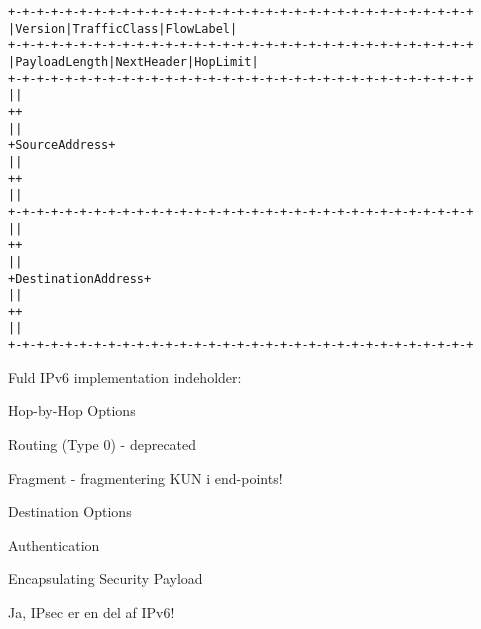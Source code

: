 \documentclass[Screen16to9,17pt]{foils}
\begin{document}
\begin{alltt}\footnotesize
   +-+-+-+-+-+-+-+-+-+-+-+-+-+-+-+-+-+-+-+-+-+-+-+-+-+-+-+-+-+-+-+-+
   |Version| Traffic Class |           Flow Label                  |
   +-+-+-+-+-+-+-+-+-+-+-+-+-+-+-+-+-+-+-+-+-+-+-+-+-+-+-+-+-+-+-+-+
   |         Payload Length        |  Next Header  |   Hop Limit   |
   +-+-+-+-+-+-+-+-+-+-+-+-+-+-+-+-+-+-+-+-+-+-+-+-+-+-+-+-+-+-+-+-+
   |                                                               |
   +                                                               +
   |                                                               |
   +                         Source Address                        +
   |                                                               |
   +                                                               +
   |                                                               |
   +-+-+-+-+-+-+-+-+-+-+-+-+-+-+-+-+-+-+-+-+-+-+-+-+-+-+-+-+-+-+-+-+
   |                                                               |
   +                                                               +
   |                                                               |
   +                      Destination Address                      +
   |                                                               |
   +                                                               +
   |                                                               |
   +-+-+-+-+-+-+-+-+-+-+-+-+-+-+-+-+-+-+-+-+-+-+-+-+-+-+-+-+-+-+-+-+
\end{alltt}



\begin{list1}
\item Fuld IPv6 implementation indeholder:
\begin{list2}
\item Hop-by-Hop Options
\item Routing (Type 0) - deprecated
\item Fragment - fragmentering KUN i end-points!
\item Destination Options
\item Authentication
\item Encapsulating Security Payload
\end{list2}
\item Ja, IPsec er en del af IPv6!
\end{list1}

\end{document}
